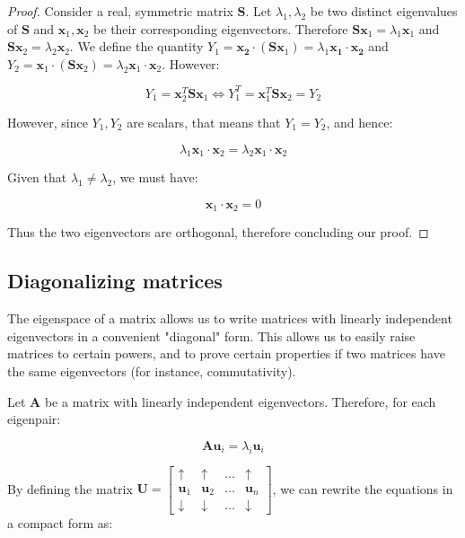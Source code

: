 \documentclass[12pt]{article}
\begin{document}
\begin{proof}
    Consider a real, symmetric matrix $\mathbf{S}$. Let $\lambda_1, \lambda_2$ be two distinct eigenvalues of $\mathbf{S}$ and $\mathbf{x}_1, \mathbf{x}_2$ be their corresponding eigenvectors. Therefore $\mathbf{Sx}_1 = \lambda_1\mathbf{x}_1$ and $\mathbf{Sx}_2 = \lambda_2\mathbf{x}_2$. We define the quantity $Y_1 = \mathbf{x_2} \cdot (\mathbf{Sx}_1) = \lambda_1 \mathbf{x_1 \cdot x_2}$ and $Y_2 = \mathbf{x}_1 \cdot (\mathbf{Sx}_2) = \lambda_2\mathbf{x}_1 \cdot \mathbf{x}_2$. However:

    \[ Y_1 = \mathbf{x}_2^T\mathbf{Sx}_1 \iff Y_1^T = \mathbf{x}_1^T\mathbf{S}\mathbf{x}_2 = Y_2 \]

    However, since $Y_1, Y_2$ are scalars, that means that $Y_1 = Y_2$, and hence:

    \[ \lambda_1\mathbf{x}_1 \cdot \mathbf{x}_2 = \lambda_2\mathbf{x}_1 \cdot \mathbf{x}_2 \]

    Given that $\lambda_1 \neq \lambda_2$, we must have:

    \[ \mathbf{x}_1 \cdot \mathbf{x}_2 = 0 \]

    Thus the two eigenvectors are orthogonal, therefore concluding our proof.
\end{proof}

\newpage

\subsection{Diagonalizing matrices}

The eigenspace of a matrix allows us to write matrices with linearly independent eigenvectors in a convenient "diagonal" form. This allows us to easily raise matrices to certain powers, and to prove certain properties if two matrices have the same eigenvectors (for instance, commutativity).

Let $\mathbf{A}$ be a matrix with linearly independent eigenvectors. Therefore, for each eigenpair:

\[ \mathbf{Au}_i = \lambda_i\mathbf{u}_i \]

By defining the matrix $\mathbf{U} = \begin{bmatrix}
    \uparrow & \uparrow & \dots & \uparrow \\
    \mathbf{u}_1 & \mathbf{u}_2 & \dots & \mathbf{u}_n \\
    \downarrow & \downarrow & \dots & \downarrow 
\end{bmatrix}$, we can rewrite the equations in a compact form as:
\end{document}

